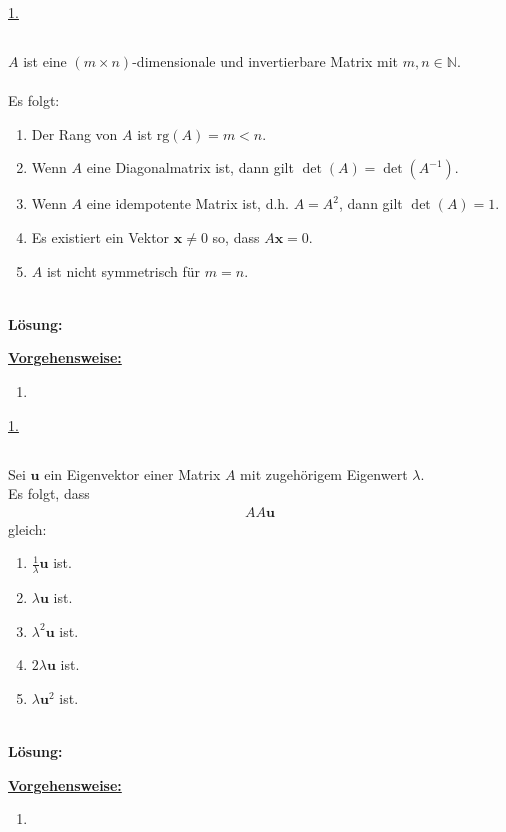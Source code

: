 \underline{1. }\\


\newpage
\subsection*{}
$A$ ist eine $(m \times n)$-dimensionale und invertierbare Matrix mit $m,n \in \mathbb{N}$.\\
\\
Es folgt:
\renewcommand{\labelenumi}{(\alph{enumi})}
\begin{enumerate}
	\item 
	Der Rang von $A$ ist $\mathrm{rg}(A) = m < n$.
	\item 
	Wenn $A$ eine Diagonalmatrix ist, dann gilt $\det(A) = \det(A^{-1})$.
	\item 
	Wenn $A$ eine idempotente Matrix ist, d.h. $A = A^2$, dann gilt $\det(A) = 1$.
	\item 
	Es existiert ein Vektor $\mathbf{x} \neq 0$ so, dass $A \mathbf{x} = 0$.
	\item 
	$A$ ist nicht symmetrisch  für $m=n$. 
\end{enumerate}
\ \\
\textbf{Lösung:}
\begin{mdframed}
\underline{\textbf{Vorgehensweise:}}
\renewcommand{\labelenumi}{\theenumi.}
\begin{enumerate}
\item 
\end{enumerate}
\end{mdframed}

\underline{1. }\\

\newpage

\subsection*{}
Sei $\mathbf{u} $ ein Eigenvektor einer Matrix $A$ mit zugehörigem Eigenwert $\lambda$.
\\
Es folgt, dass 
\begin{align*}
	AA \mathbf{u}
\end{align*}
gleich:
\renewcommand{\labelenumi}{(\alph{enumi})}
\begin{enumerate}
	\item 
	$ \frac{1}{\lambda} \mathbf{u} $ ist.
	\item 
	$ \lambda \mathbf{u} $ ist.
	\item
	$ \lambda^2 \mathbf{u}$ ist.
	\item
	$ 2\lambda \mathbf{u} $ ist.
	\item 
	$ \lambda \mathbf{u}^2 $ ist.
\end{enumerate}
\ \\
\textbf{Lösung:}
\begin{mdframed}
\underline{\textbf{Vorgehensweise:}}
\renewcommand{\labelenumi}{\theenumi.}
\begin{enumerate}
\item
\end{enumerate}
\end{mdframed}

